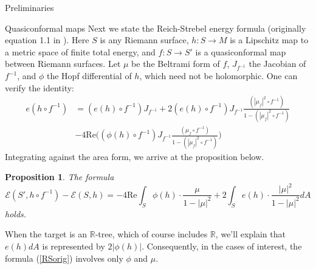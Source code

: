 \documentclass[10pt]{amsart}
\newcommand{\R}{\mathbb R}
\newtheorem{prop}[thm]{Proposition}
\theoremstyle{definition}
\begin{document}
\begin{section}{Preliminaries}
\begin{subsection}{Quasiconformal maps}
Next we state the Reich-Strebel energy formula (originally equation 1.1 in \cite{RS}). Here $S$ is any Riemann surface, $h:S\to M$ is a Lipschitz map to a metric space of finite total energy, and $f:S\to S'$ is a quasiconformal map between Riemann surfaces. Let $\mu$ be the Beltrami form of $f$, $J_{f^{-1}}$ the Jacobian of $f^{-1}$, and $\phi$ the Hopf differential of $h$, which need not be holomorphic. One can verify the identity: 
\begin{align*}
     e(h\circ f^{-1})&=(e(h)\circ f^{-1})J_{f^{-1}}+2(e(h)\circ f^{-1})J_{f^{-1}} \frac{(|\mu_f|^2\circ f^{-1})}{1-(|\mu_f|^2\circ f^{-1})} \\
     &-4\textrm{Re}\Big ( (\phi(h)\circ f^{-1})J_{f^{-1}}\frac{(\mu_f\circ f^{-1})}{1-(|\mu_f|^2\circ f^{-1})}\Big )
\end{align*}
Integrating against the area form, we arrive at the proposition below.
\begin{prop}
The formula \begin{equation}\label{RSorig}
    \mathcal{E}(S',h\circ f^{-1}) -\mathcal{E}(S,h) =  -4\textrm{Re} \int_S \phi(h)\cdot \frac{ \mu}{1-|\mu|^2} + 2\int_S e(h)\cdot \frac{|\mu|^2}{1-|\mu|^2}dA
\end{equation}
holds.
\end{prop}
When the target is an $\R$-tree, which of course includes $\R$, we'll explain that $e(h)dA$ is represented by $2|\phi(h)|$.
Consequently, in the cases of interest, the formula (\ref{RSorig}) involves only $\phi$ and $\mu$.
\end{subsection}
\end{section}
\end{document}
